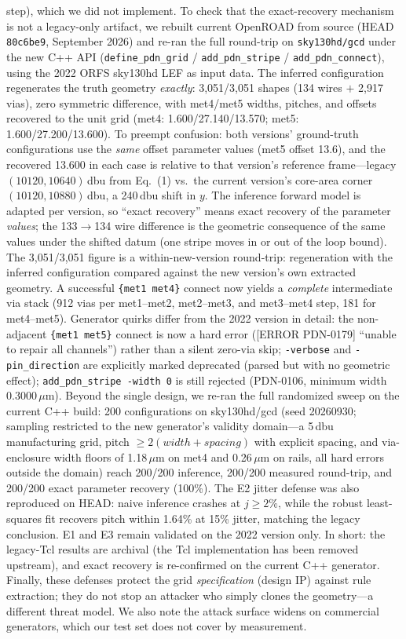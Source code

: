 \documentclass[11pt]{article}
\begin{document}
step), which we did not implement.  To check that the exact-recovery
mechanism is not a legacy-only artifact, we rebuilt current OpenROAD from
source (HEAD \texttt{80c6be9}, September 2026) and re-ran the full
round-trip on \texttt{sky130hd/gcd} under the new C++ API
(\texttt{define\_pdn\_grid} / \texttt{add\_pdn\_stripe} /
\texttt{add\_pdn\_connect}), using the 2022 ORFS sky130hd LEF as input
data.  The inferred configuration regenerates the truth geometry
\emph{exactly}: 3,051/3,051 shapes (134 wires $+$ 2,917 vias), zero
symmetric difference, with met4/met5 widths, pitches, and offsets
recovered to the unit grid (met4: 1.600/27.140/13.570; met5:
1.600/27.200/13.600).  To preempt confusion: both versions' ground-truth
configurations use the \emph{same} offset parameter values (met5 offset
13.6), and the recovered 13.600 in each case is relative to that
version's reference frame---legacy $(10120, 10640)$\,dbu from Eq.~(1)
vs.\ the current version's core-area corner $(10120, 10880)$\,dbu, a
240\,dbu shift in $y$.  The inference forward model is adapted per
version, so ``exact recovery'' means exact recovery of the parameter
\emph{values}; the 133$\to$134 wire difference is the geometric
consequence of the same values under the shifted datum (one stripe moves
in or out of the loop bound).  The 3{,}051/3{,}051 figure is a
within-new-version round-trip: regeneration with the inferred
configuration compared against the new version's own extracted geometry.  A successful \texttt{\{met1 met4\}} connect now
yields a \emph{complete} intermediate via stack (912 vias per
met1--met2, met2--met3, and met3--met4 step, 181 for met4--met5).
Generator quirks differ from the 2022 version in detail: the
non-adjacent \texttt{\{met1 met5\}} connect is now a hard error
([ERROR PDN-0179] ``unable to repair all channels'') rather than a
silent zero-via skip; \texttt{-verbose} and \texttt{-pin\_direction}
are explicitly marked deprecated (parsed but with no geometric effect);
\texttt{add\_pdn\_stripe -width 0} is still rejected (PDN-0106, minimum
width $0.3000\,\mu\mathrm{m}$).  Beyond the single design, we re-ran
the full randomized sweep on the current C++ build: 200 configurations
on sky130hd/gcd (seed 20260930; sampling restricted to the new
generator's validity domain---a 5\,dbu manufacturing grid, pitch
$\geq 2(\mathit{width}+\mathit{spacing})$ with explicit spacing, and
via-enclosure width floors of 1.18\,$\mu$m on met4 and 0.26\,$\mu$m on
rails, all hard errors outside the domain) reach 200/200 inference,
200/200 measured round-trip, and 200/200 exact parameter recovery
(100\%).  The E2 jitter defense was also reproduced on HEAD: naive
inference crashes at $j \geq 2\%$, while the robust least-squares fit
recovers pitch within 1.64\% at 15\% jitter, matching the legacy
conclusion.  E1 and E3 remain validated on the 2022 version only.  In
short: the legacy-Tcl results are archival (the Tcl implementation has
been removed upstream), and exact recovery is re-confirmed on the
current C++ generator.
Finally, these defenses protect the grid \emph{specification} (design IP)
against rule extraction; they do not stop an attacker who simply clones
the geometry---a different threat model.  We also note the attack surface
widens on commercial generators, which our test set does not cover by
measurement.
\end{document}
